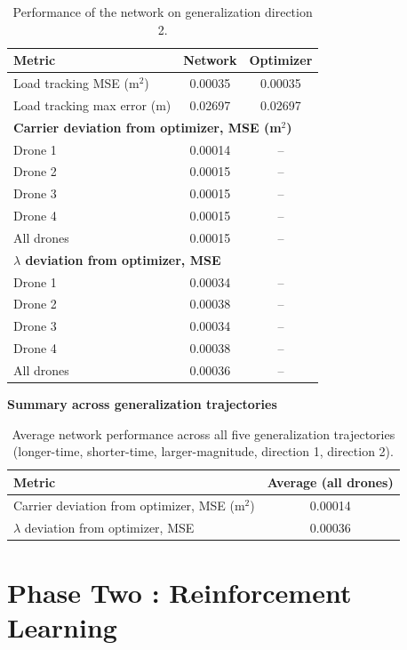 \begin{table}[H]
  \centering
  \caption{Performance of the network on generalization direction 2.}
  \label{tab:gen-dir2}
  \begin{tabular}{lcc}
    \hline
    \textbf{Metric} & \textbf{Network} & \textbf{Optimizer} \\
    \hline
    Load tracking MSE (m$^2$) & 0.00035 & 0.00035 \\
    Load tracking max error (m) & 0.02697 & 0.02697 \\
    \hline
    \multicolumn{3}{l}{\textbf{Carrier deviation from optimizer, MSE (m$^2$)}} \\
    \hline
    Drone 1 & 0.00014 & -- \\
    Drone 2 & 0.00015 & -- \\
    Drone 3 & 0.00015 & -- \\
    Drone 4 & 0.00015 & -- \\
    All drones & 0.00015 & -- \\
    \hline
    \multicolumn{3}{l}{\textbf{$\lambda$ deviation from optimizer, MSE}} \\
    \hline
    Drone 1 & 0.00034 & -- \\
    Drone 2 & 0.00038 & -- \\
    Drone 3 & 0.00034 & -- \\
    Drone 4 & 0.00038 & -- \\
    All drones & 0.00036 & -- \\
    \hline
  \end{tabular}
\end{table}

\noindent\textbf{Summary across generalization trajectories}

\begin{table}[H]
  \centering
  \caption{Average network performance across all five generalization trajectories (longer-time, shorter-time, larger-magnitude, direction 1, direction 2).}
  \label{tab:gen-summary}
  \begin{tabular}{lc}
    \hline
    \textbf{Metric} & \textbf{Average (all drones)} \\
    \hline
    Carrier deviation from optimizer, MSE (m$^2$) & 0.00014 \\
    $\lambda$ deviation from optimizer, MSE & 0.00036 \\
    \hline
  \end{tabular}
\end{table}

\section{Phase Two : Reinforcement Learning}

